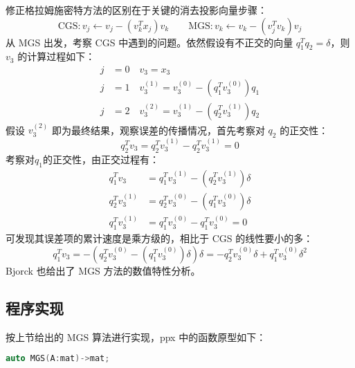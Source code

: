 修正格拉姆施密特方法的区别在于关键的消去投影向量步骤：
\begin{equation}
    \text{CGS}\colon v_j\leftarrow v_j-(v_k^Tx_j)v_k\qquad \text{MGS}\colon v_k\leftarrow v_k-(v_j^Tv_k)v_j
\end{equation}
从 MGS 出发，考察 CGS 中遇到的问题。依然假设有不正交的向量 $q_1^Tq_2=\delta$，则 $v_3$ 的计算过程如下：
\begin{align*}
    j & =0 \quad v_3=x_3                                 \\
    j & =1 \quad v_3^{(1)}=v_3^{(0)}-(q_1^Tv_3^{(0)})q_1 \\
    j & =2 \quad v_3^{(2)}=v_3^{(1)}-(q_2^Tv_3^{(1)})q_2
\end{align*}
假设 $v_3^{(2)}$ 即为最终结果，观察误差的传播情况，首先考察对 $q_2$ 的正交性：
\begin{equation}
    q_2^Tv_3=q_2^Tv_3^{(1)}-q_2^Tv_3^{(1)}=0
\end{equation}
考察对$q_1$的正交性，由正交过程有：
\begin{equation}
    \begin{aligned}
        q_1^Tv_3       & =q_1^Tv_3^{(1)}-(q_2^Tv_3^{(1)})\delta \\
        q_2^Tv_3^{(1)} & =q_2^Tv_3^{(0)}-(q_1^Tv_3^{(0)})\delta \\
        q_1^Tv_3^{(1)} & =q_1^Tv_3^{(0)}-q_1^Tv_3^{(0)}=0
    \end{aligned}
\end{equation}
可发现其误差项的累计速度是乘方级的，相比于 CGS 的线性要小的多：
\begin{equation}
    q_1^Tv_3=-(q_2^Tv_3^{(0)}-(q_1^Tv_3^{(0)})\delta)\delta=-q_2^Tv_3^{(0)}\delta+q_1^Tv_3^{(0)}\delta^2
\end{equation}
Bjorck\cite{BJORCK1994297} 也给出了 MGS 方法的数值特性分析。

\subsection{程序实现}
按上节给出的 MGS 算法进行实现，ppx 中的函数原型如下：
\begin{tcolorbox}
    \begin{center}
        \begin{minipage}{.92\linewidth}
            \begin{lstlisting}[language=C++]
auto MGS(A:mat)->mat;
\end{lstlisting}
        \end{minipage}
    \end{center}
\end{tcolorbox}

